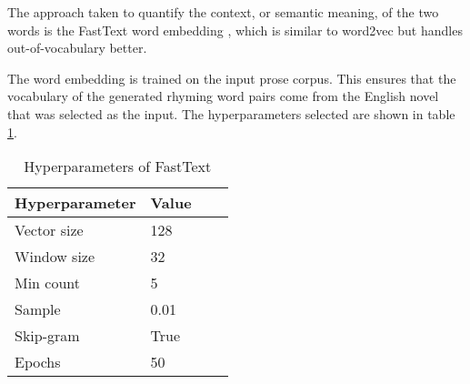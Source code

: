 \documentclass[11pt,a4paper]{article}
\begin{document}
The approach taken to quantify the context, or semantic meaning, of the two words is the FastText word embedding \cite{fasttext}, which is similar to word2vec \cite{wordvec} but handles out-of-vocabulary better.

The word embedding is trained on the input prose corpus. This ensures that the vocabulary of the generated rhyming word pairs come from the English novel that was selected as the input. The hyperparameters selected are shown in table \ref{table:HP_fasttext}.

\begin{table}[ht]
\centering
\begin{tabular}{ll c c}
	\hline\hline
	Hyperparameter & Value \\ [0.5ex]
	\hline\hline
	Vector size & 128 \\ [0.5ex]
	Window size & 32 \\ [0.5ex]
	Min count & 5 \\ [0.5ex]
	Sample & 0.01\\ [0.5ex]
	Skip-gram & True\\ [0.5ex]
	Epochs  & 50\\ [0.5ex]
	\hline
\end{tabular}
\caption{Hyperparameters of FastText}
\label{table:HP_fasttext}
\end{table}
\end{document}
